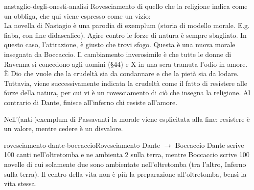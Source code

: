 \documentclass[preview]{standalone}
\begin{document}
\begin{snippet}{nastaglio-degli-onesti-analisi}
    Rovesciamento di quello che la religione indica come un obbliga, che qui viene espresso come un vizio: \\
    La novella di Nastagio è una parodia di exemplum (storia di modello morale. E.g. fiaba, con fine didascalico).
    Agire contro le forze di natura è sempre sbagliato. In questo caso, l'attrazione, è giusto che trovi sfogo.
    Questa è una nuova morale insegnata da Boccaccio.
    Il cambiamento inverosimile è che tutte le donne di Ravenna si concedono agli uomini (§44)
    e X in una sera tramuta l'odio in amore.
    È Dio che vuole che la crudeltà sia da condannare e che la pietà sia da lodare.
    Tuttavia, viene successivamente indicata la crudeltà come il fatto di resistere alle forze della natura, per cui
    vi è un rovesciamento di ciò che insegna la religione.
    Al contrario di Dante, finisce all'inferno chi resiste all'amore.
    

    Nell'(anti-)exemplum di Passavanti la morale viene esplicitata alla fine: resistere è un valore,
    mentre cedere è un disvalore.

\end{snippet}

\begin{snippetnote}{rovesciamento-dante-boccaccio}{Rovesciamento Dante \(\rightarrow\) Boccaccio}
    Dante scrive 100 canti nell'oltretomba e ne ambienta 2 sulla terra, mentre Boccaccio scrive 100 novelle di cui solamente
    due sono ambientate nell'oltretomba (tra l'altro, Inferno sulla terra).
    Il centro della vita non è più la preparazione all'oltretomba, bensì la vita stessa.
\end{snippetnote}
\end{document}
